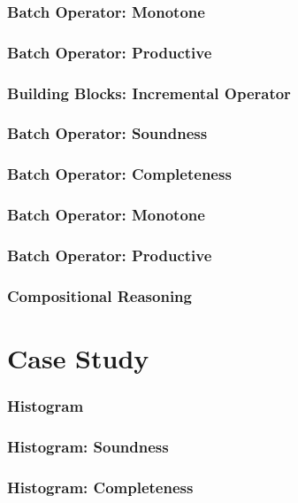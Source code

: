 \documentclass[aspectratio=169,10pt]{beamer}
\begin{document}
\begin{frame}[fragile]
  \frametitle{Batch Operator: Monotone}

\end{frame}

\begin{frame}[fragile]
  \frametitle{Batch Operator: Productive}

\end{frame}

\begin{frame}[fragile]
  \frametitle{Building Blocks: Incremental Operator}

\end{frame}

\begin{frame}[fragile]
  \frametitle{Batch Operator: Soundness}

\end{frame}

\begin{frame}[fragile]
  \frametitle{Batch Operator: Completeness}

\end{frame}

\begin{frame}[fragile]
  \frametitle{Batch Operator: Monotone}

\end{frame}

\begin{frame}[fragile]
  \frametitle{Batch Operator: Productive}

\end{frame}

\begin{frame}[fragile]
  \frametitle{Compositional Reasoning}

\end{frame}

\section{Case Study}

\begin{frame}
  \frametitle{Histogram}
\end{frame}

\begin{frame}
  \frametitle{Histogram: Soundness}

\end{frame}

\begin{frame}
  \frametitle{Histogram: Completeness}
\end{frame}
\end{document}
